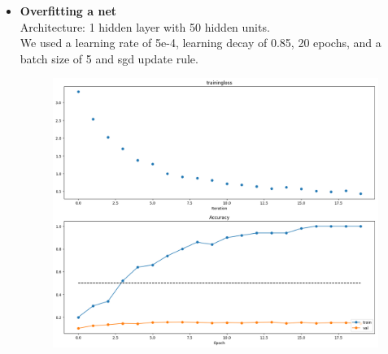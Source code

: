 \begin{itemize}
  
  \item \textbf{Overfitting a net}\\
    Architecture: 1 hidden layer with 50 hidden units.\\
    We used a learning rate of 5e-4, learning decay of 0.85, 20 epochs, and a batch size of 5 and sgd update rule.
    

    \begin{figure}[!ht]
        \centering
        {{\includegraphics[scale = 0.35]{../nets/overfit_net/diagrams.png}}}  
    \end{figure}


\end{itemize}
